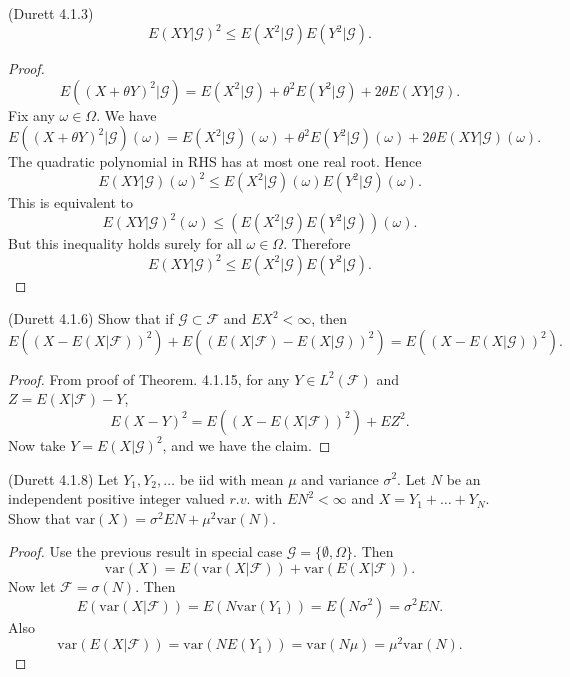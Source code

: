 \begin{problem} (Durett 4.1.3)
	\[
		E\left( XY | \mathcal{G} \right) ^2
		\le E(X^2 | \mathcal{G}) E(Y^2 | \mathcal{G})
	.\] 
\end{problem}
\begin{proof}
	\begin{equation}
		E\left((X + \theta Y)^2 |\mathcal{G}\right)
		= E(X^2 | \mathcal{G}) + \theta^2 E(Y^2 | \mathcal{G}) + 2 \theta E(X Y | \mathcal{G})
	.\end{equation} 
	Fix any $\omega \in \Omega$. We have
\begin{equation}
		E\left((X + \theta Y)^2 |\mathcal{G}\right)(\omega)
		= E(X^2 | \mathcal{G})(\omega) + \theta^2 E(Y^2 | \mathcal{G})(\omega) + 2 \theta E(X Y | \mathcal{G})(\omega)
	.\end{equation}
	The quadratic polynomial in RHS has at most one real root. Hence
	\[
		E(XY | \mathcal{G})(\omega)^2 \le E(X^2 |\mathcal{G}) (\omega) E(Y^2| \mathcal{G})(\omega)
	.\] 
	This is equivalent to
	\[
		E(XY | \mathcal{G})^2 (\omega) \le \left( E(X^2 | \mathcal{G}) E(Y^2 | \mathcal{G}) \right) (\omega)
	.\] 
	But this inequality holds surely for all $\omega \in \Omega$. Therefore
	\[
		E(XY | \mathcal{G})^2 \le E(X^2 | \mathcal{G}) E(Y^2 | \mathcal{G})
	.\] 
\end{proof}

\begin{problem}(Durett 4.1.6)
	Show that if $\mathcal{G} \subset  \mathcal{F}$ and $EX^2 < \infty $, then
	\[
		E\left( \left(X - E(X | \mathcal{F})\right)^2 \right) 
		+ E\left( \left( E(X | \mathcal{F}) - E(X | \mathcal{G}) \right) ^2 \right) 
		= E\left( \left( X - E(X | \mathcal{G}) \right) ^2 \right) 
	.\] 
\end{problem}
\begin{proof}
	From proof of Theorem. 4.1.15, for any $Y \in L^2(\mathcal{F})$ and $Z = E(X | \mathcal{F}) - Y$,
	\[
		E(X - Y)^2 = E\left( \left( X - E(X | \mathcal{F}) \right) ^2 \right) + E Z^2
	.\] 
	Now take $Y = E(X | \mathcal{G})^2$, and we have the claim.
\end{proof}


\begin{problem}(Durett 4.1.8)
	Let $Y_1, Y_2, \ldots$ be iid with mean $\mu$ and variance $\sigma^2$. Let $N$ be an independent positive integer valued $r.v.$ with $EN^2 < \infty $ and $X = Y_1 + \ldots + Y_N$. Show that $\text{var}(X) = \sigma^2 EN + \mu^2 \text{var}(N)$.
\end{problem}
\begin{proof}
	Use the previous result in special case $\mathcal{G} = \{\emptyset , \Omega\} $. Then
	\[
		\text{var}(X) = E\left( \text{var}(X | \mathcal{F}) \right) + \text{var}\left( E(X | \mathcal{F}) \right) 
	.\] 
	Now let $\mathcal{F} = \sigma(N)$. Then
	\[
		E\left( \text{var}(X | \mathcal{F}) \right) 
		= E\left( N \text{var}(Y_1) \right) 
		= E( N \sigma^2) = \sigma^2 EN
	.\] 
	Also
	\[
		\text{var}\left( E(X|\mathcal{F}) \right) 
		= \text{var}\left( N E(Y_1) \right) 
		= \text{var}(N \mu) = \mu^2 \text{var}(N)
	.\] 
\end{proof}

